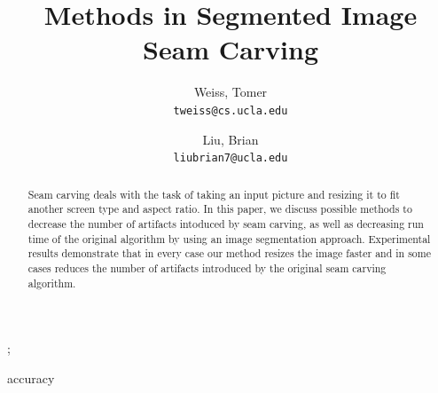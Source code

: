 \documentclass[conference]{acmsiggraph}
\title{Methods in Segmented Image Seam Carving}
\author{
  Weiss, Tomer\\
  \texttt{tweiss@cs.ucla.edu}
  \and
  Liu, Brian\\
  \texttt{liubrian7@ucla.edu}
}
\begin{document}

\maketitle

\begin{abstract}

\paragraph{}
Seam carving deals with the task of taking an input picture and resizing it to fit another screen type and aspect ratio. In this paper, we discuss possible methods to decrease the number of artifacts intoduced by seam carving, as well as decreasing run time of the original algorithm by using an image segmentation approach. Experimental results demonstrate that in every case our method resizes the image faster and in some cases reduces the number of artifacts introduced by the original seam carving algorithm.




\end{abstract}

\begin{CRcatlist}  

  
  ;     
  
\end{CRcatlist}accuracy

\keywordlist

\end{document}
